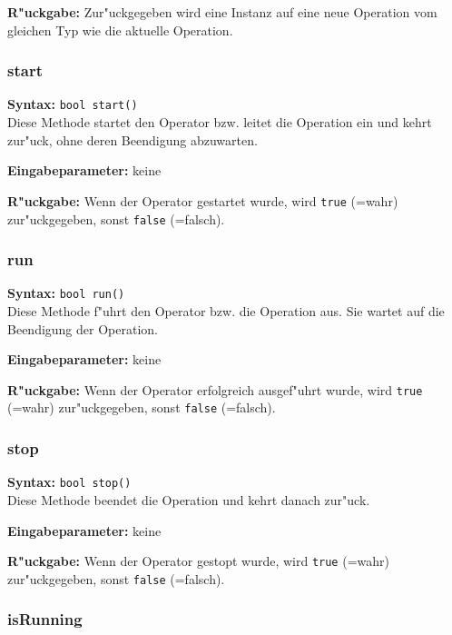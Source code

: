 \bigskip\noindent
\textbf{R"uckgabe:} Zur"uckgegeben wird eine Instanz auf eine neue Operation vom gleichen Typ wie die aktuelle Operation.


\subsubsection{start}

\textbf{Syntax:} \verb|bool start()| \\

Diese Methode startet den Operator bzw. leitet die Operation ein und kehrt zur"uck, ohne deren Beendigung abzuwarten.

\bigskip\noindent
\textbf{Eingabeparameter:} keine

\bigskip\noindent
\textbf{R"uckgabe:} Wenn der Operator gestartet wurde, wird \verb|true| (=wahr) zur"uckgegeben, sonst \verb|false| (=falsch).


\subsubsection{run}

\textbf{Syntax:} \verb|bool run()| \\

Diese Methode f"uhrt den Operator bzw. die Operation aus. Sie wartet auf die Beendigung der Operation.

\bigskip\noindent
\textbf{Eingabeparameter:} keine

\bigskip\noindent
\textbf{R"uckgabe:} Wenn der Operator erfolgreich ausgef"uhrt wurde, wird \verb|true| (=wahr) zur"uckgegeben, sonst \verb|false| (=falsch).


\subsubsection{stop}

\textbf{Syntax:} \verb|bool stop()| \\

Diese Methode beendet die Operation und kehrt danach zur"uck.

\bigskip\noindent
\textbf{Eingabeparameter:} keine

\bigskip\noindent
\textbf{R"uckgabe:} Wenn der Operator gestopt wurde, wird \verb|true| (=wahr) zur"uckgegeben, sonst \verb|false| (=falsch).


\subsubsection{isRunning}

